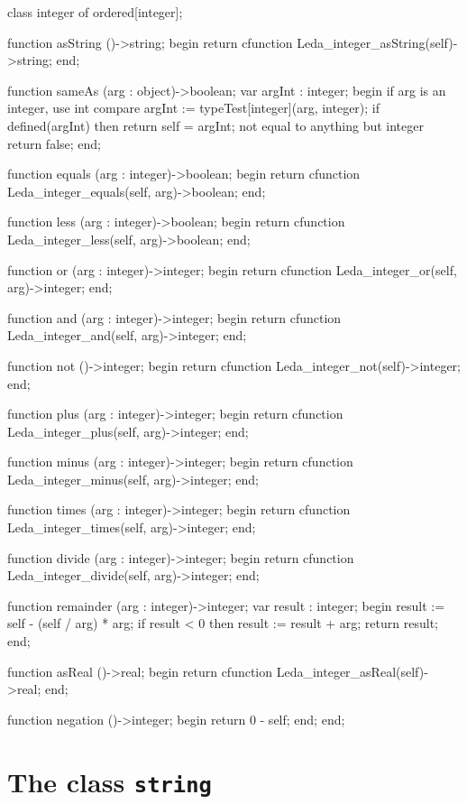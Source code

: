 \begin{cprog}

class integer of ordered[integer];

	function asString ()->string;
	begin
		return cfunction Leda_integer_asString(self)->string;
	end;

	function sameAs (arg : object)->boolean;
	var
		argInt : integer;
	begin		
			{ if arg is an integer, use int compare }
		argInt := typeTest[integer](arg, integer);
		if defined(argInt) then
			return self = argInt;
			{ not equal to anything but integer }
		return false;
	end;

	function equals (arg : integer)->boolean;
	begin
		return cfunction
			Leda_integer_equals(self, arg)->boolean;
	end;

	function less (arg : integer)->boolean;
	begin
		return cfunction
			Leda_integer_less(self, arg)->boolean;
	end;

	function or (arg : integer)->integer;
	begin
		return cfunction
			Leda_integer_or(self, arg)->integer;
	end;

	function and (arg : integer)->integer;
	begin
		return cfunction
			Leda_integer_and(self, arg)->integer;
	end;

	function not ()->integer;
	begin
		return cfunction Leda_integer_not(self)->integer;
	end;

	function plus (arg : integer)->integer;
	begin
		return cfunction
			Leda_integer_plus(self, arg)->integer;
	end;

	function minus (arg : integer)->integer;
	begin
		return cfunction
			Leda_integer_minus(self, arg)->integer;
	end;

	function times (arg : integer)->integer;
	begin
		return cfunction
			Leda_integer_times(self, arg)->integer;
	end;

	function divide (arg : integer)->integer;
	begin
		return cfunction
			Leda_integer_divide(self, arg)->integer;
	end;

	function remainder (arg : integer)->integer;
	var
		result : integer;
	begin
		result := self - (self / arg) * arg;
		if result < 0 then
			result := result + arg;
		return result;
	end;

	function asReal ()->real;
	begin
		return cfunction
			Leda_integer_asReal(self)->real;
	end;

	function negation ()->integer;
	begin
		return 0 - self;
	end;
end;

\end{cprog}

\section{The class {\tt string}}

